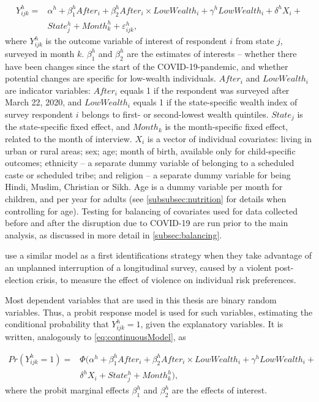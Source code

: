 \documentclass[12pt,a4paper,notitlepage]{article}
\begin{document}
\begin{equation} \label{eq:continuousModel}
\begin{split}
    Y_{ijk}^h = & \alpha^h + \beta_{1}^h After_i + \beta_{2}^h After_i \times LowWealth_i + \gamma^h LowWealth_i + \delta^h X_i +\\
    & State_j^h + Month_k^h + \varepsilon_{ijk}^h,
\end{split}
\end{equation}
%
where $Y_{ijk}^h$ is the outcome variable of interest of respondent $i$ from state $j$, surveyed in month $k$. $\beta_1^h$ and $\beta_2^h$ are the estimates of interests -- whether there have been changes since the start of the COVID-19-pandemic, and whether potential changes are specific for low-wealth individuals. $After_i$ and $LowWealth_i$ are indicator variables: $After_i$ equals 1 if the respondent was surveyed after March 22, 2020, and $LowWealth_i$ equals 1 if the state-specific wealth index of survey respondent $i$ belongs to first- or second-lowest wealth quintiles. $State_j$ is the state-specific fixed effect, and $Month_k$ is the month-specific fixed effect, related to the month of interview. $X_i$ is a vector of individual covariates: living in urban or rural areas; sex; age; month of birth, available only for child-specific outcomes; ethnicity -- a separate dummy variable of belonging to a scheduled caste or scheduled tribe; and religion -- a separate dummy variable for being Hindi, Muslim, Christian or Sikh. Age is a dummy variable per month for children, and per year for adults (see \cref{subsubsec:nutrition} for details when controlling for age). Testing for balancing of covariates used for data collected before and after the disruption due to COVID-19 are run prior to the main analysis, as discussed in more detail in \cref{subsec:balancing}.

\citet{Jakiela:2019} use a similar model as a first identifications strategy when they take advantage of an unplanned interruption of a longitudinal survey, caused by a violent post-election crisis, to measure the effect of violence on individual risk preferences.

Most dependent variables that are used in this thesis are binary random variables. Thus, a probit response model is used for such variables, estimating the conditional probability that $Y_{ijk}^h=1$, given the explanatory variables. It is written, analogously to \cref{eq:continuousModel}, as

\begin{equation} \label{eq:probitModel}
\begin{split}
    Pr(Y_{ijk}^h = 1) = &\Phi(\alpha^h + \beta_{1}^h After_i + \beta_{2}^h After_i \times LowWealth_i + \gamma^h LowWealth_i + \\
    & \delta^h X_i + State_j^h + Month_k^h),
\end{split}
\end{equation}
%
where the probit marginal effects $\beta_{1}^h$ and $\beta_{2}^h$ are the effects of interest.
\end{document}
